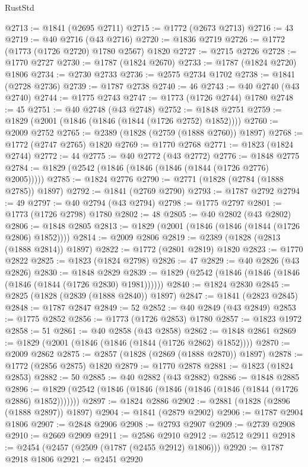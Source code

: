 \begin{lexlean}{RustStd}
\begin{coremodule}
@2713 := @1841 (@2695 @2711)
@2715 := @1772 (@2673 @2713)
@2716 := 43
@2719 := @40 @2716 (@43 @2716)
@2720 := @1836 @2719
@2726 := @1772 (@1773 (@1726 @2720) @1780 @2567) @1820
@2727 := @2715 @2726
@2728 := @1770 @2727
@2730 := @1787 (@1824 @2670)
@2733 := @1787 (@1824 @2720) @1806
@2734 := @2730 @2733
@2736 := @2575 @2734 @1702
@2738 := @1841 (@2728 @2736)
@2739 := @1787 @2738
@2740 := 46
@2743 := @40 @2740 (@43 @2740)
@2744 := @1775 @2743
@2747 := @1773 (@1726 @2744) @1780
@2748 := 45
@2751 := @40 @2748 (@43 @2748)
@2752 := @1848 @2751
@2759 := @1829 (@2001 (@1846 (@1846 (@1844 (@1726 @2752) @1852))))
@2760 := @2009 @2752
@2765 := @2389 (@1828 (@2759 (@1888 @2760)) @1897)
@2768 := @1772 (@2747 @2765) @1820
@2769 := @1770 @2768
@2771 := @1823 (@1824 @2744)
@2772 := 44
@2775 := @40 @2772 (@43 @2772)
@2776 := @1848 @2775
@2784 := @1829 (@2542 (@1846 (@1846 (@1846 (@1844 (@1726 @2776) @2005)))))
@2785 := @1824 @2776
@2790 := @2771 (@1828 (@2784 (@1888 @2785)) @1897)
@2792 := @1841 (@2769 @2790)
@2793 := @1787 @2792
@2794 := 49
@2797 := @40 @2794 (@43 @2794)
@2798 := @1775 @2797
@2801 := @1773 (@1726 @2798) @1780
@2802 := 48
@2805 := @40 @2802 (@43 @2802)
@2806 := @1848 @2805
@2813 := @1829 (@2001 (@1846 (@1846 (@1844 (@1726 @2806) @1852))))
@2814 := @2009 @2806
@2819 := @2389 (@1828 (@2813 (@1888 @2814)) @1897)
@2822 := @1772 (@2801 @2819) @1820
@2823 := @1770 @2822
@2825 := @1823 (@1824 @2798)
@2826 := 47
@2829 := @40 @2826 (@43 @2826)
@2830 := @1848 @2829
@2839 := @1829 (@2542 (@1846 (@1846 (@1846 (@1846 (@1844 (@1726 @2830) @1981))))))
@2840 := @1824 @2830
@2845 := @2825 (@1828 (@2839 (@1888 @2840)) @1897)
@2847 := @1841 (@2823 @2845)
@2848 := @1787 @2847
@2849 := 52
@2852 := @40 @2849 (@43 @2849)
@2853 := @1775 @2852
@2856 := @1773 (@1726 @2853) @1780
@2857 := @1823 @1972
@2858 := 51
@2861 := @40 @2858 (@43 @2858)
@2862 := @1848 @2861
@2869 := @1829 (@2001 (@1846 (@1846 (@1844 (@1726 @2862) @1852))))
@2870 := @2009 @2862
@2875 := @2857 (@1828 (@2869 (@1888 @2870)) @1897)
@2878 := @1772 (@2856 @2875) @1820
@2879 := @1770 @2878
@2881 := @1823 (@1824 @2853)
@2882 := 50
@2885 := @40 @2882 (@43 @2882)
@2886 := @1848 @2885
@2896 := @1829 (@2542 (@1846 (@1846 (@1846 (@1846 (@1846 (@1844 (@1726 @2886) @1852)))))))
@2897 := @1824 @2886
@2902 := @2881 (@1828 (@2896 (@1888 @2897)) @1897)
@2904 := @1841 (@2879 @2902)
@2906 := @1787 @2904 @1806
@2907 := @2848 @2906
@2908 := @2793 @2907
@2909 := @2739 @2908
@2910 := @2669 @2909
@2911 := @2586 @2910
@2912 := @2512 @2911
@2918 := @2454 (@2457 (@2509 (@1787 (@2455 @2912) @1806)))
@2920 := @1787 @2918 @1806
@2921 := @2451 @2920

\end{coremodule}
\end{lexlean}

